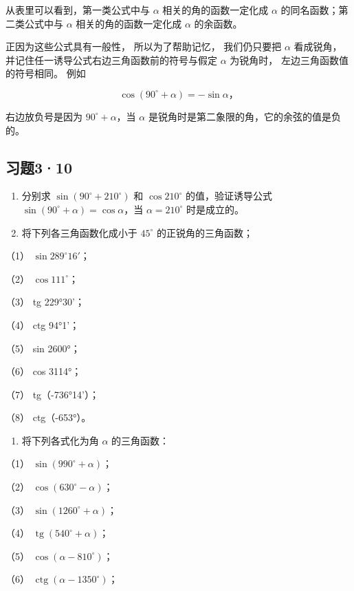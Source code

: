 从表里可以看到，第一类公式中与 \(\alpha\) 相关的角的函数一定化成
\(\alpha\) 的同名函数；第二类公式中与 \(\alpha\) 相关的角的函数一定化成
\(\alpha\) 的余函数。

正因为这些公式具有一般性， 所以为了帮助记忆， 我们仍只要把 \(\alpha\)
看成锐角， 并记住任一诱导公式右边三角函数前的符号与假定 \(\alpha\)
为锐角时， 左边三角函数值的符号相同。 例如

\[
\cos (90 ^{\circ} + \alpha) = - \sin \alpha \text{，}
\]

右边放负号是因为 \(90^{\circ} + \alpha\)，当 \(\alpha\)
是锐角时是第二象限的角，它的余弦的值是负的。

\subsection{习题3·10}

\begin{enumerate}
\item
  分别求 \(\sin (90^{\circ} + 210^{\circ})\) 和 \(\cos 210^{\circ}\)
  的值，验证诱导公式 \(\sin (90^{\circ} + \alpha) = \cos \alpha\)，当
  \(\alpha = 210^{\circ}\) 时是成立的。
\item
  将下列各三角函数化成小于 \(45^{\circ}\) 的正锐角的三角函数；
\end{enumerate}

（1） \(\sin 289^{\circ}16'\)；

（2） \(\cos 111^{\circ}\)；

（3） tg 229°30'；

（4） ctg 94°1'；

（5） sin 2600°；

（6） cos 3114°；

（7） tg（-736°14'）；

（8） ctg（-653°）。

\begin{enumerate}[start=3]
\item
  将下列各式化为角 \(\alpha\) 的三角函数：
\end{enumerate}

（1） \(\sin (990^{\circ} + \alpha)\)；

（2） \(\cos (630^{\circ} - \alpha)\)；

（3） \(\sin (1260^{\circ} + \alpha)\)；

（4） \(\operatorname{tg}(540^{\circ} + \alpha)\)；

（5） \(\cos (\alpha - 810^{\circ})\)；

（6） \(\operatorname{ctg}(\alpha - 1350^{\circ})\)；

